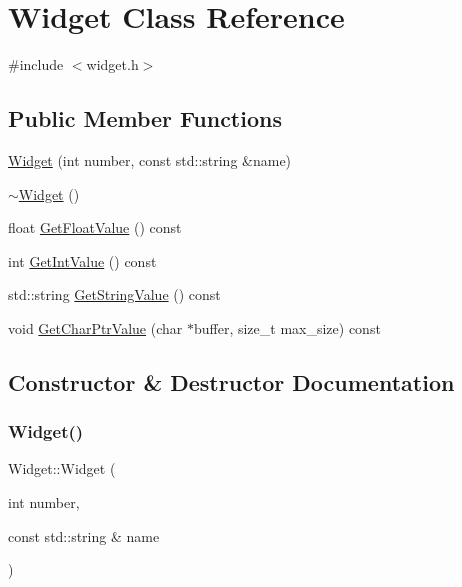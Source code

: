 \hypertarget{class_widget}{}\section{Widget Class Reference}
\label{class_widget}


{\ttfamily \#include $<$widget.\+h$>$}

\subsection*{Public Member Functions}
\begin{DoxyCompactItemize}
\item 
\hyperlink{class_widget_ab573b75a8a69d29c298af2485fb9cda9}{Widget} (int number, const std\+::string \&name)
\item 
\hyperlink{class_widget_aa24f66bcbaaec6d458b0980e8c8eae65}{$\sim$\+Widget} ()
\item 
float \hyperlink{class_widget_abf639d975e02cabda8132873aca1a333}{Get\+Float\+Value} () const
\item 
int \hyperlink{class_widget_a15e7d0423020a7a98063a749fb97bdd3}{Get\+Int\+Value} () const
\item 
std\+::string \hyperlink{class_widget_a7a6e3a7fca3a9373f631c94dc1494d22}{Get\+String\+Value} () const
\item 
void \hyperlink{class_widget_a50791a556979f22f5593383143c7f815}{Get\+Char\+Ptr\+Value} (char $\ast$buffer, size\+\_\+t max\+\_\+size) const
\end{DoxyCompactItemize}


\subsection{Constructor \& Destructor Documentation}
\mbox{\label{class_widget_ab573b75a8a69d29c298af2485fb9cda9}} 
\subsubsection{\texorpdfstring{Widget()}{Widget()}}
{\footnotesize\ttfamily Widget\+::\+Widget (\begin{DoxyParamCaption}\item[{int}]{number,  }\item[{const std\+::string \&}]{name }\end{DoxyParamCaption})}


